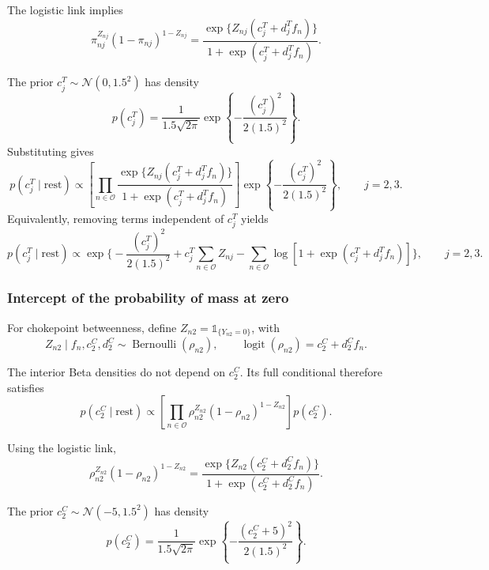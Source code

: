 \documentclass[pdftex,12pt,openright,a4paper,oneside]{book}
\begin{document}
The logistic link implies
\begin{equation*}
\pi_{nj}^{Z_{nj}}
(1-\pi_{nj})^{1-Z_{nj}}
=
\frac{
\exp\{Z_{nj}(c_j^T+d_j^Tf_n)\}
}{
1+\exp(c_j^T+d_j^Tf_n)
}.
\end{equation*}

The prior $c_j^T\sim\mathcal{N}(0,1.5^2)$
has density
\begin{equation*}
p(c_j^T)
=
\frac{1}{1.5\sqrt{2\pi}}
\exp\!\left\{
-\frac{(c_j^T)^2}{2(1.5)^2}
\right\}.
\end{equation*}
Substituting gives
\begin{equation*}
p(c_j^T\mid\mathrm{rest})
\propto 
\left[
\prod_{n\in\mathcal{O}}
\frac{
\exp\{Z_{nj}(c_j^T+d_j^Tf_n)\}
}{
1+\exp(c_j^T+d_j^Tf_n)
}
\right]
\exp\!\left\{
-\frac{(c_j^T)^2}{2(1.5)^2}
\right\},
\qquad j=2,3.
\end{equation*}
Equivalently, removing terms independent of $c_j^T$
yields
\begin{equation*}
p(c_j^T\mid\mathrm{rest})
\propto
\exp\Bigg\{-\frac{(c_j^T)^2}{2(1.5)^2}+
c_j^T\sum_{n\in\mathcal{O}}Z_{nj}-
\sum_{n\in\mathcal{O}}
\log\!\left[
1+\exp(c_j^T+d_j^Tf_n)
\right]
\Bigg\},
\qquad j=2,3.
\end{equation*}

\subsubsection{Intercept of the probability of mass at zero}

For chokepoint betweenness, define
$Z_{n2}=\mathds{1}_{\{Y_{n2}=0\}}$, with
\begin{equation*}
Z_{n2}\mid f_n,c_2^C,d_2^C
\sim\operatorname{Bernoulli}(\rho_{n2}),
\qquad
\operatorname{logit}(\rho_{n2})
=
c_2^C+d_2^Cf_n.
\end{equation*}

The interior Beta densities do not depend on $c_2^C$.
Its full conditional therefore satisfies
\begin{equation*}
p(c_2^C\mid\mathrm{rest})
\propto
\left[
\prod_{n\in\mathcal{O}}
\rho_{n2}^{Z_{n2}}
(1-\rho_{n2})^{1-Z_{n2}}
\right]
p(c_2^C).
\end{equation*}

Using the logistic link,
\begin{equation*}
\rho_{n2}^{Z_{n2}}
(1-\rho_{n2})^{1-Z_{n2}}
=
\frac{
\exp\{Z_{n2}(c_2^C+d_2^Cf_n)\}
}{
1+\exp(c_2^C+d_2^Cf_n)
}.
\end{equation*}

The prior $c_2^C\sim\mathcal{N}(-5,1.5^2)$
has density
\begin{equation*}
p(c_2^C)
=
\frac{1}{1.5\sqrt{2\pi}}
\exp\!\left\{
-\frac{(c_2^C+5)^2}{2(1.5)^2}
\right\}.
\end{equation*}
\end{document}
